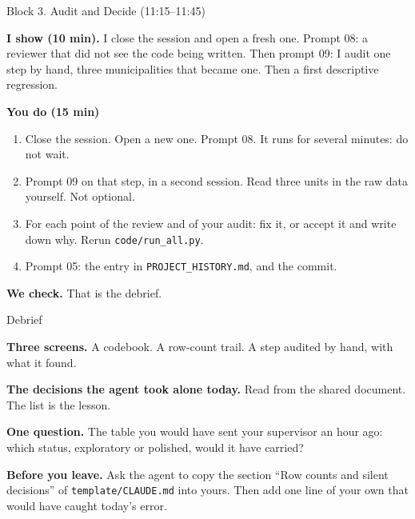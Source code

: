 \documentclass[svgnames,x11names,dvipsnames]{beamer}
\newcommand{\chg}[1]{{\bfseries #1}}
\renewcommand{\chg}[1]{#1}
\begin{document}
\begin{frame}{Block 3. Audit and Decide (11:15--11:45)}

\small
\textbf{I show (10 min).} I close the session and open a fresh one. Prompt 08: a reviewer that did not see the code being written. Then prompt 09: I audit one step by hand, three municipalities that became one. \chg{Then a first descriptive regression.}

\vspace{0.3cm}

\textbf{You do (15 min)}
\begin{enumerate}
    \setlength{\itemsep}{3pt}
    \item Close the session. Open a new one. Prompt 08. It runs for several minutes: do not wait.
    \item Prompt 09 on that step, in a second session. Read three units in the raw data yourself. \alert{Not optional.}
    \item For each point of the review and of your audit: fix it, or accept it and write down why. Rerun \texttt{code/run\_all.py}.
    \item Prompt 05: the entry in \texttt{PROJECT\_HISTORY.md}, and the commit.
\end{enumerate}

\vspace{0.3cm}

\textbf{We check.} That is the debrief.

\end{frame}


\begin{frame}{Debrief}

\textbf{Three screens.} A codebook. A row-count trail. A step audited by hand, with what it found.

\vspace{0.3cm}

\textbf{The decisions the agent took alone today.} Read from the shared document. The list is the lesson.

\vspace{0.3cm}

\textbf{One question.} The table you would have sent your supervisor an hour ago: which status, exploratory or polished, would it have carried?

\vspace{0.3cm}

\textbf{Before you leave.} Ask the agent to copy the section ``Row counts and silent decisions'' of \texttt{template/CLAUDE.md} into yours. Then add one line of your own that would have caught today's error.

\end{frame}
\end{document}
